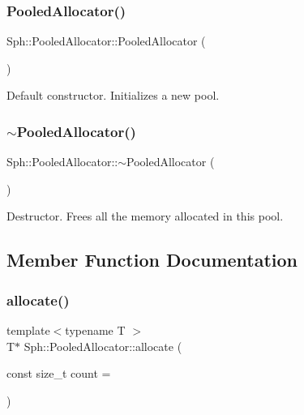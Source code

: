 \subsubsection{\texorpdfstring{Pooled\+Allocator()}{PooledAllocator()}}
{\footnotesize\ttfamily Sph\+::\+Pooled\+Allocator\+::\+Pooled\+Allocator (\begin{DoxyParamCaption}{ }\end{DoxyParamCaption})\hspace{0.3cm}{\ttfamily [inline]}}

Default constructor. Initializes a new pool. \hypertarget{classSph_1_1PooledAllocator_a4a29f040cee13bd4a118bd31d762c8fb}{}\label{classSph_1_1PooledAllocator_a4a29f040cee13bd4a118bd31d762c8fb} 
\subsubsection{\texorpdfstring{$\sim$\+Pooled\+Allocator()}{~PooledAllocator()}}
{\footnotesize\ttfamily Sph\+::\+Pooled\+Allocator\+::$\sim$\+Pooled\+Allocator (\begin{DoxyParamCaption}{ }\end{DoxyParamCaption})\hspace{0.3cm}{\ttfamily [inline]}}

Destructor. Frees all the memory allocated in this pool. 

\subsection{Member Function Documentation}
\hypertarget{classSph_1_1PooledAllocator_a7c9d02c5d34a4e6cb0393d78a978c56f}{}\label{classSph_1_1PooledAllocator_a7c9d02c5d34a4e6cb0393d78a978c56f} 
\subsubsection{\texorpdfstring{allocate()}{allocate()}}
{\footnotesize\ttfamily template$<$typename T $>$ \\
T$\ast$ Sph\+::\+Pooled\+Allocator\+::allocate (\begin{DoxyParamCaption}\item[{const size\+\_\+t}]{count = {} }\end{DoxyParamCaption})\hspace{0.3cm}{\ttfamily [inline]}}

